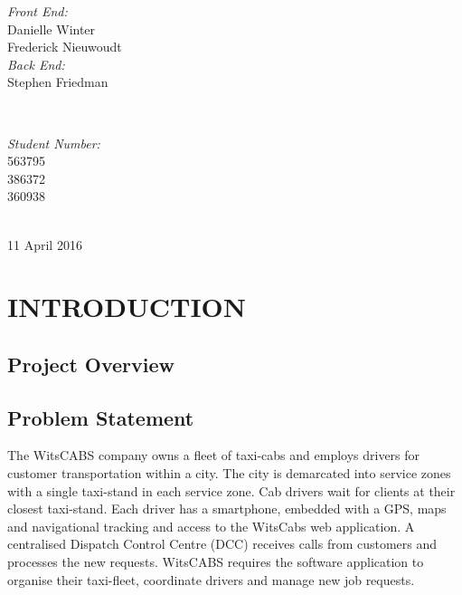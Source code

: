 \documentclass[12pt]{article}
\begin{document}
\begin{titlepage}

\begin{minipage}{0.4\textwidth}
\begin{flushleft} 
\emph{Front End:}\\
Danielle Winter\\
Frederick Nieuwoudt\\[0.1cm]
\emph{Back End:}\\
Stephen Friedman
\end{flushleft}
\end{minipage}
~
\begin{minipage}{0.4\textwidth}
\begin{flushright} 
\emph{Student Number:} \\
563795\\
386372\\[0.6cm]
360938
\end{flushright}
\end{minipage}\\[0.5cm]

{\large 11 April 2016}\\[0.5cm]

\begin{abstract}

\end{abstract}

\vfill %

\end{titlepage}
\tableofcontents
\newpage
\section{INTRODUCTION}
\subsection{Project Overview}

\subsection{Problem Statement}
The WitsCABS company owns a fleet of taxi-cabs and employs drivers for customer transportation within a city. The city is demarcated into service zones with a single taxi-stand in each service zone. Cab drivers wait for clients at their closest taxi-stand. Each driver has a smartphone, embedded with a GPS, maps and navigational tracking and access to the WitsCabs web application. A centralised Dispatch Control Centre (DCC) receives calls from customers and processes the new requests. WitsCABS requires the software application to organise their taxi-fleet, coordinate drivers and manage new job requests.
\end{document}
